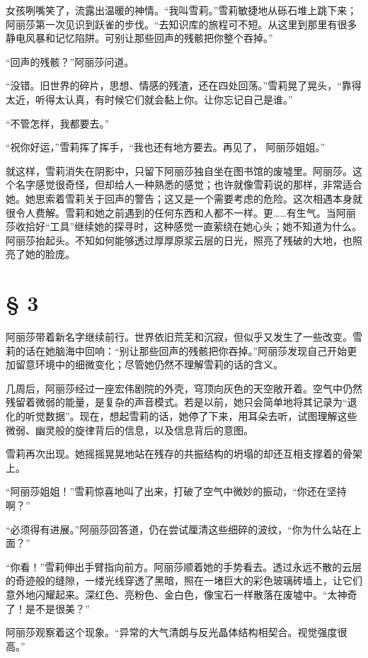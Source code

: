 女孩咧嘴笑了，流露出温暖的神情。“我叫雪莉。”雪莉敏捷地从砾石堆上跳下来；阿丽莎第一次见识到跃雀的步伐。“去知识库的旅程可不短。从这里到那里有很多静电风暴和记忆陷阱。可别让那些回声的残骸把你整个吞掉。”

“回声的残骸？”阿丽莎问道。

“没错。旧世界的碎片，思想、情感的残渣，还在四处回荡。”雪莉晃了晃头，“靠得太近，听得太认真，有时候它们就会黏上你。让你忘记自己是谁。”

“不管怎样，我都要去。”

“祝你好运，”雪莉挥了挥手，“我也还有地方要去。再见了， 阿丽莎姐姐。”

就这样，雪莉消失在阴影中，只留下阿丽莎独自坐在图书馆的废墟里。阿丽莎。这个名字感觉很奇怪，但却给人一种熟悉的感觉；也许就像雪莉说的那样，非常适合她。她思索着雪莉关于回声的警告；这又是一个需要考虑的危险。这次相遇本身就很令人费解。雪莉和她之前遇到的任何东西和人都不一样。更……有生气。当阿丽莎收拾好“工具”继续她的探寻时，这种感觉一直萦绕在她心头；她不知道为什么。阿丽莎抬起头。不知如何能够透过厚厚原浆云层的日光，照亮了残破的大地，也照亮了她的脸庞。

\section{§ 3}

阿丽莎带着新名字继续前行。世界依旧荒芜和沉寂，但似乎又发生了一些改变。雪莉的话在她脑海中回响：“别让那些回声的残骸把你吞掉。”阿丽莎发现自己开始更加留意环境中的细微变化；尽管她仍然不理解雪莉的话的含义。

几周后，阿丽莎经过一座宏伟剧院的外壳，穹顶向灰色的天空敞开着。空气中仍然残留着微弱的能量，是复杂的声音模式。若是以前，她只会简单地将其记录为“退化的听觉数据”。现在，想起雪莉的话，她停了下来，用耳朵去听，试图理解这些微弱、幽灵般的旋律背后的信息，以及信息背后的意图。

雪莉再次出现。她摇摇晃晃地站在残存的共振结构的坍塌的却还互相支撑着的骨架上。

“阿丽莎姐姐！”雪莉惊喜地叫了出来，打破了空气中微妙的振动，“你还在坚持啊？”

“必须得有进展。”阿丽莎回答道，仍在尝试厘清这些细碎的波纹，“你为什么站在上面？”

“你看！”雪莉伸出手臂指向前方。阿丽莎顺着她的手势看去。透过永远不散的云层的奇迹般的缝隙，一缕光线穿透了黑暗，照在一堵巨大的彩色玻璃砖墙上，让它们意外地闪耀起来。深红色、亮粉色、金白色，像宝石一样散落在废墟中。“太神奇了！是不是很美？”

阿丽莎观察着这个现象。“异常的大气清朗与反光晶体结构相契合。视觉强度很高。”

